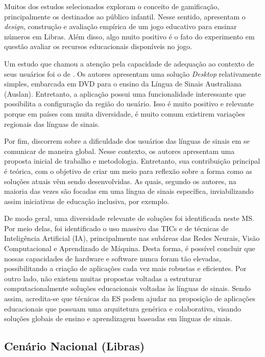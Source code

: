 Muitos dos estudos selecionados exploram o conceito de gamificação, principalmente os destinados ao público infantil. Nesse sentido,  apresentam o \textit{design}, construção e avaliação empírica de um jogo educativo para ensinar números em Libras. Além disso, algo muito positivo é o fato do experimento em questão avaliar os recursos educacionais disponíveis no jogo.

Um estudo que chamou a atenção pela capacidade de adequação ao contexto de seus usuários foi o de . Os autores apresentam uma solução \textit{Desktop} relativamente simples, embarcada em DVD para o ensino da Língua de Sinais Australiana (Auslan). Entretanto, a aplicação possui uma funcionalidade interessante que possibilita a configuração da região do usuário. Isso é muito positivo e relevante porque em países com muita diversidade, é muito comum existirem variações regionais das línguas de sinais.

Por fim,  discorrem sobre a dificuldade dos usuários das línguas de sinais em se comunicar de maneira global. Nesse contexto, os autores apresentam uma proposta inicial de trabalho e metodologia. Entretanto, sua contribuição principal é teórica, com o objetivo de criar um meio para reflexão sobre a forma como as soluções atuais vêm sendo desenvolvidas. As quais, segundo os autores, na maioria das vezes são focadas em uma língua de sinais específica, inviabilizando assim iniciativas de educação inclusiva, por exemplo.

De modo geral, uma diversidade relevante de soluções foi identificada neste MS. Por meio delas, foi identificado o uso massivo das TICs e de técnicas de Inteligência Artificial (IA), principalmente nas subáreas das Redes Neurais, Visão Computacional e Aprendizado de Máquina. Desta forma, é possível concluir que nossas capacidades de hardware e software nunca foram tão elevadas, possibilitando a criação de aplicações cada vez mais robustas e eficientes. Por outro lado, não existem muitas propostas voltadas a estruturar computacionalmente soluções educacionais voltadas às línguas de sinais. Sendo assim, acredita-se que técnicas da ES podem ajudar na proposição de aplicações educacionais que possuam uma arquitetura genérica e colaborativa, visando soluções globais de ensino e aprendizagem baseadas em línguas de sinais.


\subsection{Cenário Nacional (Libras)}
\label{ms:cenario-nacional}

